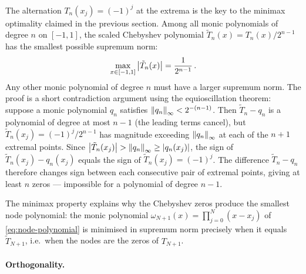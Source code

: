 The alternation $T_n(x_j) = (-1)^j$ at the extrema is the key to
the minimax optimality claimed in the previous section.  Among all monic
polynomials of degree $n$ on $[-1, 1]$, the scaled Chebyshev
polynomial $\tilde{T}_n(x) = T_n(x) / 2^{n-1}$ has the smallest
possible supremum norm:
%
\begin{equation}
  \max_{x \in [-1,1]} \left\lvert \tilde{T}_n(x) \right\rvert
    = \frac{1}{2^{n-1}} \,.
  \label{eq:chebyshev-minimax}
\end{equation}
%
Any other monic polynomial of degree $n$ must have a larger
supremum norm.  The proof is a short contradiction argument using
the equioscillation theorem: suppose a monic polynomial $q_n$
satisfies $\left\lVert q_n \right\rVert_\infty < 2^{-(n-1)}$.  Then
$\tilde{T}_n - q_n$ is a polynomial of degree at most $n - 1$
(the leading terms cancel), but
$\tilde{T}_n(x_j) = (-1)^j / 2^{n-1}$ has magnitude exceeding
$\left\lVert q_n \right\rVert_\infty$ at each of the $n + 1$ extremal points.
Since $\left\lvert \tilde{T}_n(x_j) \right\rvert > \left\lVert q_n \right\rVert_\infty \geq \left\lvert q_n(x_j) \right\rvert$,
the sign of $\tilde{T}_n(x_j) - q_n(x_j)$ equals the sign of
$\tilde{T}_n(x_j) = (-1)^j$.  The difference $\tilde{T}_n - q_n$
therefore changes sign between each consecutive pair of extremal
points, giving at least $n$ zeros --- impossible for a polynomial of
degree $n - 1$.

The minimax property explains why the Chebyshev zeros produce the
smallest node polynomial: the monic polynomial
$\omega_{N+1}(x) = \prod_{j=0}^{N}(x - x_j)$
of \cref{eq:node-polynomial} is minimised in supremum norm precisely
when it equals $\tilde{T}_{N+1}$, i.e.\ when the nodes are the
zeros of $T_{N+1}$.

\paragraph{Orthogonality.}

